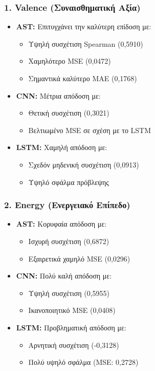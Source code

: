 \documentclass[a4paper,12pt]{article}
\begin{document}
\subsubsection*{1. Valence (Συναισθηματική Αξία)}
\begin{itemize}
    \item \textbf{AST:} Επιτυγχάνει την καλύτερη επίδοση με:
    \begin{itemize}
        \item Υψηλή συσχέτιση Spearman (0,5910)
        \item Χαμηλότερο MSE (0,0472)
        \item Σημαντικά καλύτερο MAE (0,1768)
    \end{itemize}
    
    \item \textbf{CNN:} Μέτρια απόδοση με:
    \begin{itemize}
        \item Θετική συσχέτιση (0,3021)
        \item Βελτιωμένο MSE σε σχέση με το LSTM
    \end{itemize}
    
    \item \textbf{LSTM:} Χαμηλή απόδοση με:
    \begin{itemize}
        \item Σχεδόν μηδενική συσχέτιση (0,0913)
        \item Υψηλό σφάλμα πρόβλεψης
    \end{itemize}
\end{itemize}

\subsubsection*{2. Energy (Ενεργειακό Επίπεδο)}
\begin{itemize}
    \item \textbf{AST:} Κορυφαία απόδοση με:
    \begin{itemize}
        \item Ισχυρή συσχέτιση (0,6872)
        \item Εξαιρετικά χαμηλό MSE (0,0296)
    \end{itemize}
    
    \item \textbf{CNN:} Πολύ καλή απόδοση με:
    \begin{itemize}
        \item Υψηλή συσχέτιση (0,5955)
        \item Ικανοποιητικό MSE (0,0408)
    \end{itemize}
    
    \item \textbf{LSTM:} Προβληματική απόδοση με:
    \begin{itemize}
        \item Αρνητική συσχέτιση (-0,3128)
        \item Πολύ υψηλό σφάλμα (MSE: 0,2728)
    \end{itemize}
\end{itemize}
\end{document}
